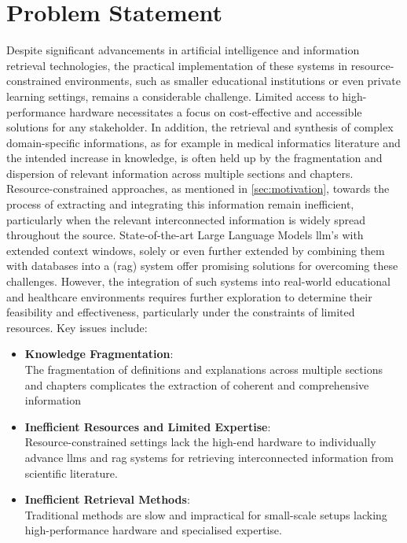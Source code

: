 \section{Problem Statement}\label{sec:problem statement}
Despite significant advancements in artificial intelligence and information retrieval technologies, the practical implementation of these systems in resource-constrained environments, such as smaller educational institutions or even private learning settings, remains a considerable challenge. 
Limited access to high-performance hardware necessitates a focus on cost-effective and accessible solutions for any stakeholder.
%
In addition, the retrieval and synthesis of complex domain-specific informations, as for example in medical informatics literature and the intended increase in knowledge, is often held up by the fragmentation and dispersion of relevant information across multiple sections and chapters. 
Resource-constrained approaches, as mentioned in \cref{sec:motivation}, towards the process of extracting and integrating this information remain inefficient, particularly when the relevant interconnected information is widely spread throughout the source.
%
State-of-the-art Large Language Models \ac{llm}'s with extended context windows, solely or even further extended by combining them with databases into a (\ac{rag}) system offer promising solutions for overcoming these challenges. 
However, the integration of such systems into real-world educational and healthcare environments requires further exploration to determine their feasibility and effectiveness, particularly under the constraints of limited resources.
%
Key issues include:
\begin{itemize}
    \item \textbf{Knowledge Fragmentation}:\\
    The fragmentation of definitions and explanations across multiple sections and chapters complicates the extraction of coherent and comprehensive information 
    \item \textbf{Inefficient Resources and Limited Expertise}:\\ 
    Resource-constrained settings lack the high-end hardware  to individually advance \ac{llm}s and \ac{rag} systems for retrieving interconnected information from scientific literature.
    
    \item \textbf{Inefficient Retrieval Methods}:\\ Traditional methods are slow and impractical for small-scale setups lacking high-performance hardware and specialised expertise.
\end{itemize}

